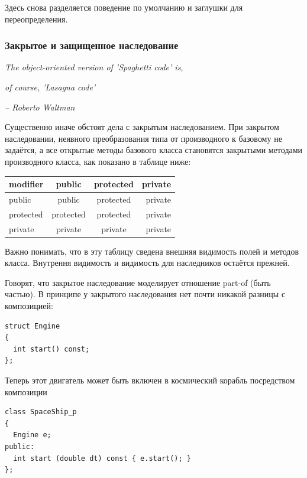 \documentclass[a4paper,12pt,oneside]{article}
\begin{document}
Здесь снова разделяется поведение по умолчанию и заглушки для переопределения.

\subsubsection{Закрытое и защищенное наследование}\label{OtherInheritance}

\hfill\textit{The object-oriented version of 'Spaghetti code' is,}

\hfill\textit{of course, 'Lasagna code'}{\vspace{0.5em}}

\hfill\textit{-- Roberto Waltman}

Существенно иначе обстоят дела с закрытым наследованием. При закрытом наследовании, неявного преобразования типа от производного к базовому не задаётся, а все открытые методы базового класса становятся закрытыми методами производного класса, как показано в таблице ниже:

\begin{center}
  \begin{tabular}{ | l | c | c | r | }
    \hline
    modifier & public & protected & private \\ \hline \hline
    public & public & protected & private \\ \hline
    protected & protected & protected & private \\ \hline
    private & private & private & private \\ \hline
  \end{tabular}
\end{center}

Важно понимать, что в эту таблицу сведена внешняя видимость полей и методов класса. Внутрення видимость и видимость для наследников остаётся прежней.

Говорят, что закрытое наследование моделирует отношение part-of (быть частью). В принципе у закрытого наследования нет почти никакой разницы с композицией:

\begin{lstlisting}
struct Engine
{
  int start() const;
};
\end{lstlisting}

Теперь этот двигатель может быть включен в космический корабль посредством композиции

\begin{lstlisting}
class SpaceShip_p
{
  Engine e;
public:
  int start (double dt) const { e.start(); } 
};
\end{lstlisting}
\end{document}
